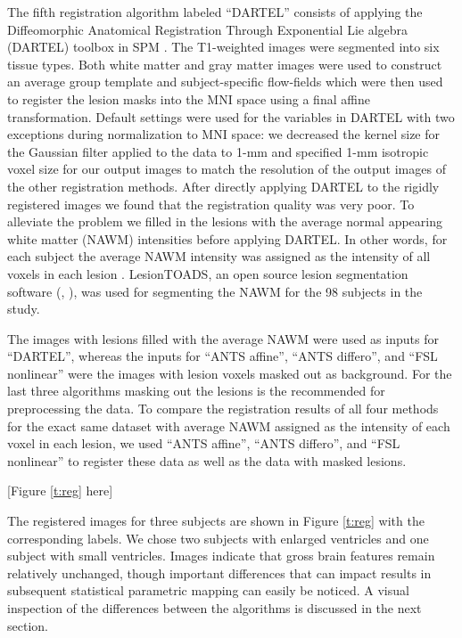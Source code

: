 \documentclass[10pt]{article}
\begin{document}
The fifth registration algorithm labeled ``DARTEL'' consists of applying the Diffeomorphic Anatomical Registration Through Exponential Lie algebra (DARTEL) toolbox in SPM \cite{friston2011statistical}. The T1-weighted images were segmented into six tissue types. Both white matter and gray matter images were used to construct an average group template and subject-specific flow-fields which were then used to register the lesion masks into the MNI space using a final affine transformation. Default settings were used for the variables in DARTEL with two exceptions during normalization to MNI space: we decreased the kernel size for the Gaussian filter applied to the data to 1-mm and specified 1-mm isotropic voxel size  for our output images to match the resolution of the output images of the other registration methods. After directly applying DARTEL to the rigidly registered images we found that the registration quality was very poor. To alleviate the problem we filled in the lesions with the average normal appearing white matter (NAWM) intensities before applying DARTEL. In other words, for each subject the average NAWM intensity was assigned as the intensity of all voxels in each lesion 
\cite{ceccarelli2012impact}. LesionTOADS, an open source lesion segmentation software (\cite{shiee2008topologically}, \cite{shiee2010topology}), was used for segmenting the NAWM for the 98 subjects in the study. 

The images with lesions filled with the average NAWM were used as inputs for ``DARTEL'', whereas the inputs for ``ANTS affine'', ``ANTS differo'', and ``FSL nonlinear'' were the images with lesion voxels masked out as background. For the last three algorithms masking out the lesions is the recommended for preprocessing the data. To compare the registration results of all four methods for the exact same dataset with average NAWM assigned as the intensity of each voxel in each lesion, we used ``ANTS affine'', ``ANTS differo'', and ``FSL nonlinear'' to register these data as well as the data with masked lesions. 

[Figure \ref{t:reg} here]

The registered images for three subjects are shown in Figure \ref{t:reg} with the corresponding
labels. We chose two subjects with enlarged ventricles and one subject with small
ventricles. Images indicate that gross brain features remain
relatively unchanged, though important differences that can impact
results in subsequent statistical parametric mapping can easily be noticed. A visual inspection of the differences between the algorithms is discussed in the next section.
\end{document}

